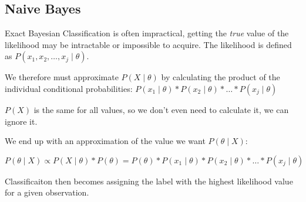 \documentclass[letterpaper,12pt]{article}
\begin{document}
\subsection{Naive Bayes}

Exact Bayesian Classification is often impractical, getting the \emph{true}
value of the likelihood may be intractable or impossible to acquire. The
likelihood is defined as $P(x_1, x_2, \dots, x_j \mid \theta)$.

We therefore must approximate $P(X \mid \theta)$ by calculating the product of the
individual conditional probabilities: $P(x_1 \mid \theta)*P(x_2 \mid
\theta)*\dots*P(x_j \mid \theta)$

$P(X)$ is the same for all values, so we don't even need to calculate it, we can
ignore it.

We end up with an approximation of the value we want $P(\theta \mid X)$:

\[
    P(\theta \mid X) \propto P(X \mid \theta)*P(\theta) = P(\theta)*P(x_1 \mid \theta)*P(x_2 \mid \theta)*\dots*P(x_j \mid \theta)
\]


Classificaiton then becomes assigning the label with the highest likelihood
value for a given observation.
\end{document}
